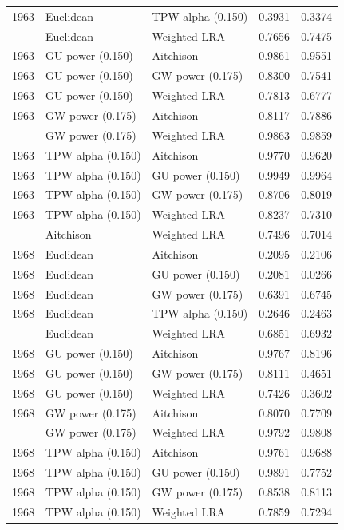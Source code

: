 \begin{longtable}[t]{rllrr}
1963 & Euclidean & TPW alpha (0.150) & 0.3931 & 0.3374\\
\addlinespace
1963 & Euclidean & Weighted LRA & 0.7656 & 0.7475\\
1963 & GU power (0.150) & Aitchison & 0.9861 & 0.9551\\
1963 & GU power (0.150) & GW power (0.175) & 0.8300 & 0.7541\\
1963 & GU power (0.150) & Weighted LRA & 0.7813 & 0.6777\\
1963 & GW power (0.175) & Aitchison & 0.8117 & 0.7886\\
\addlinespace
1963 & GW power (0.175) & Weighted LRA & 0.9863 & 0.9859\\
1963 & TPW alpha (0.150) & Aitchison & 0.9770 & 0.9620\\
1963 & TPW alpha (0.150) & GU power (0.150) & 0.9949 & 0.9964\\
1963 & TPW alpha (0.150) & GW power (0.175) & 0.8706 & 0.8019\\
1963 & TPW alpha (0.150) & Weighted LRA & 0.8237 & 0.7310\\
\addlinespace
1968 & Aitchison & Weighted LRA & 0.7496 & 0.7014\\
1968 & Euclidean & Aitchison & 0.2095 & 0.2106\\
1968 & Euclidean & GU power (0.150) & 0.2081 & 0.0266\\
1968 & Euclidean & GW power (0.175) & 0.6391 & 0.6745\\
1968 & Euclidean & TPW alpha (0.150) & 0.2646 & 0.2463\\
\addlinespace
1968 & Euclidean & Weighted LRA & 0.6851 & 0.6932\\
1968 & GU power (0.150) & Aitchison & 0.9767 & 0.8196\\
1968 & GU power (0.150) & GW power (0.175) & 0.8111 & 0.4651\\
1968 & GU power (0.150) & Weighted LRA & 0.7426 & 0.3602\\
1968 & GW power (0.175) & Aitchison & 0.8070 & 0.7709\\
\addlinespace
1968 & GW power (0.175) & Weighted LRA & 0.9792 & 0.9808\\
1968 & TPW alpha (0.150) & Aitchison & 0.9761 & 0.9688\\
1968 & TPW alpha (0.150) & GU power (0.150) & 0.9891 & 0.7752\\
1968 & TPW alpha (0.150) & GW power (0.175) & 0.8538 & 0.8113\\
1968 & TPW alpha (0.150) & Weighted LRA & 0.7859 & 0.7294\\

\end{longtable}
